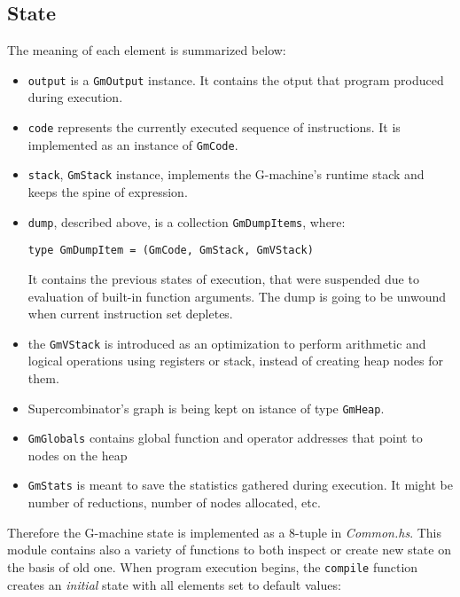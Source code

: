 \documentclass[12pt,a4paper]{report}
\begin{document}
\subsection{State}
The meaning of each element is summarized below:
\begin{itemize}
  \item \texttt{output} is a \texttt{GmOutput} instance. It contains the otput
    that program produced during execution.
  \item \texttt{code} represents the currently executed sequence of
    instructions. It is implemented as an instance of \texttt{GmCode}.
  \item \texttt{stack}, \texttt{GmStack} instance, implements the G-machine's runtime
    stack and keeps the spine of expression.
  \item \texttt{dump}, described above, is a collection \texttt{GmDumpItems},
    where:

    \hspace*{-1.5in}
    \begin{lstlisting}[style=haskell]
      type GmDumpItem = (GmCode, GmStack, GmVStack)
    \end{lstlisting}
    It contains the previous states of execution, that were suspended due to
    evaluation of built-in function arguments. The dump is going to be unwound
    when current instruction set depletes.
  \item the \texttt{GmVStack} is introduced as an optimization to perform
    arithmetic and logical operations using registers or stack, instead of creating
    heap nodes for them.
  \item Supercombinator's graph is being kept on istance of type
    \texttt{GmHeap}.
  \item \texttt{GmGlobals} contains global function and operator addresses that
    point to nodes on the heap
  \item \texttt{GmStats} is meant to save the statistics gathered during
    execution. It might be number of reductions, number of nodes allocated,
    etc.

\end{itemize}

Therefore the G-machine state is implemented as a 8-tuple in
\textit{Common.hs}. This module contains also a variety of functions to both
inspect or create new state on the basis of old one. When program execution
begins, the \texttt{compile} function creates an \textit{initial} state with
all elements set to default values:
\end{document}
